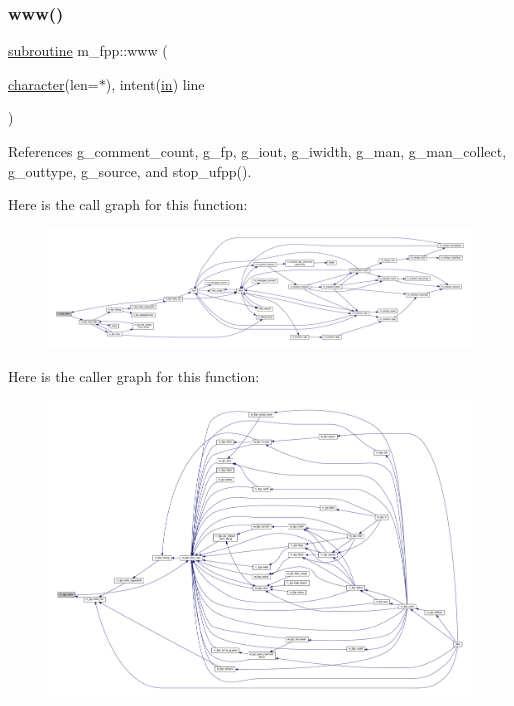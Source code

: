 \subsubsection{\texorpdfstring{www()}{www()}}
{\footnotesize\ttfamily \hyperlink{M__stopwatch_83_8txt_acfbcff50169d691ff02d4a123ed70482}{subroutine} m\+\_\+fpp\+::www (\begin{DoxyParamCaption}\item[{\hyperlink{option__stopwatch_83_8txt_abd4b21fbbd175834027b5224bfe97e66}{character}(len=$\ast$), intent(\hyperlink{M__journal_83_8txt_afce72651d1eed785a2132bee863b2f38}{in})}]{line }\end{DoxyParamCaption})}



References g\+\_\+comment\+\_\+count, g\+\_\+fp, g\+\_\+iout, g\+\_\+iwidth, g\+\_\+man, g\+\_\+man\+\_\+collect, g\+\_\+outtype, g\+\_\+source, and stop\+\_\+ufpp().

Here is the call graph for this function\+:
\nopagebreak
\begin{figure}[H]
\begin{center}
\leavevmode
\includegraphics[width=350pt]{namespacem__fpp_ac474947a9f75959822fccd4d82a05258_cgraph}
\end{center}
\end{figure}
Here is the caller graph for this function\+:
\nopagebreak
\begin{figure}[H]
\begin{center}
\leavevmode
\includegraphics[width=350pt]{namespacem__fpp_ac474947a9f75959822fccd4d82a05258_icgraph}
\end{center}
\end{figure}


